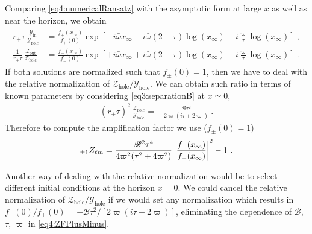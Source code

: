 Comparing \eqref{eq4:numericalRansatz} with the asymptotic form at large $x$ as well as near the horizon, we obtain
\begin{align}
	\label{eq4:YinZoutFInf}
	\begin{split}
		r_{+} \tau \,\frac{\mathscr{Y}_\mathrm{in}}{\mathscr{Y}_\mathrm{hole}} &= \frac{f_{+}(x_\infty)}{f_{+}(0)} \exp\left[ - i \bar{\omega} x_\infty - i \bar{\omega} (2-\tau)\log(x_\infty)   -i \frac{\varpi}{\tau} \log(x_\infty) \right] ~, \\[0.15cm]
		\frac{1}{r_{+} \tau} \,\frac{\mathscr{Z}_\mathrm{out}}{\mathscr{Z}_\mathrm{hole}} &= \frac{f_{-}(x_\infty)}{f_{-}(0)} \exp\left[ + i \bar{\omega} x_\infty + i \bar{\omega} (2-\tau)\log(x_\infty) -i \frac{\varpi}{\tau} \log(x_\infty) \right] ~.
	\end{split}
\end{align}
If both solutions are normalized such that $f_{\pm}(0) = 1$, then we have to deal with the relative normalization of $\mathscr{Z}_\mathrm{hole}/\mathscr{Y}_\mathrm{hole}$. We can obtain such ratio in terms of known parameters by considering \eqref{eq3:separationB} at $x\simeq0$,
\begin{align}
	(r_{+} \tau)^2 \,\frac{\mathscr{Z}_\mathrm{hole}}{\mathscr{Y}_\mathrm{hole}} = -\frac{\mathscr{B} \tau^2 }{2 \varpi (i \tau + 2 \varpi)} ~.
\end{align}
Therefore to compute the amplification factor we use ($f_{\pm}(0)=1$)
\begin{align}
	\label{eq4:ZFPlusMinus}
	\uu[\pm 1]{Z}{\ell m} = \frac{\mathscr{B}^2 \tau^4 }{4 \varpi^2 (\tau^2 + 4 \varpi^2)} \left| \frac{f_{-}(x_\infty)}{f_{+}(x_\infty)} \right|^2 - 1 ~.
\end{align}

Another way of dealing with the relative normalization would be to select different initial conditions at the horizon $x=0$.
We could cancel the relative normalization of $\mathscr{Z}_\mathrm{hole}/\mathscr{Y}_\mathrm{hole}$ if we would set any normalization which results in $f_{-}(0)/f_{+}(0) = -\mathscr{B} \tau^2 /[2 \varpi (i \tau + 2 \varpi)]$, eliminating the dependence of $\mathscr{B}$, $\tau$, $\varpi$ in \eqref{eq4:ZFPlusMinus}.

